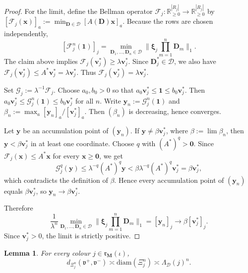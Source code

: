 \documentclass[12pt]{iopart}
\newtheorem{lemma}[theorem]{Lemma}
\newcommand*{\dist}{d}
\newcommand*{\bbbxi}{\boldsymbol{\xi}}
\newcommand*{\diam}{\mathrm{diam}}
\begin{document}
\begin{proof}
For the limit, define the Bellman operator
$\mathcal F_j:\mathbb R_{\ge 0}^{|R_j|}\to\mathbb R_{\ge 0}^{|R_j|}$ by
$[\mathcal F_j(\mathbf x)]_a:=\min_{\mathbf D\in\mathcal D}[A(\mathbf D)\mathbf x]_a$.
Because the rows are chosen independently,
\[
[\mathcal F_j^n(\mathbf 1)]_j
=
\min_{\mathbf D_1,\ldots,\mathbf D_n\in\mathcal D}
\bigg\|
\bbbxi_j\prod_{m=1}^n \mathbf D_m
\bigg\|_1.
\]
The claim above implies $\mathcal F_j(\mathbf v_j^*)\ge \lambda\mathbf v_j^*$.
Since $\mathbf D_j^*\in\mathcal D$, we also have
$\mathcal F_j(\mathbf v_j^*)\le A^*\mathbf v_j^*=\lambda\mathbf v_j^*$.
Thus $\mathcal F_j(\mathbf v_j^*)=\lambda\mathbf v_j^*$.

Set $\mathcal G_j:=\lambda^{-1}\mathcal F_j$.
Choose $a_0,b_0>0$ so that $a_0\mathbf v_j^*\le \mathbf 1\le b_0\mathbf v_j^*$.
Then $a_0\mathbf v_j^*\le \mathcal G_j^n(\mathbf 1)\le b_0\mathbf v_j^*$ for all $n$.
Write $\mathbf y_n:=\mathcal G_j^n(\mathbf 1)$ and
$\beta_n:=\max_a[\mathbf y_n]_a/[\mathbf v_j^*]_a$.
Then $(\beta_n)$ is decreasing, hence converges.

Let $\mathbf y$ be an accumulation point of $(\mathbf y_n)$.
If $\mathbf y\ne \beta\mathbf v_j^*$, where $\beta:=\lim\beta_n$, then
$\mathbf y<\beta\mathbf v_j^*$ in at least one coordinate.
Choose $q$ with $(A^*)^q>\mathbf 0$.
Since $\mathcal F_j(\mathbf x)\le A^*\mathbf x$ for every $\mathbf x\ge \mathbf 0$, we get
\[
\mathcal G_j^q(\mathbf y)
\le
\lambda^{-q}(A^*)^q\mathbf y
<
\beta\lambda^{-q}(A^*)^q\mathbf v_j^*
=
\beta\mathbf v_j^*,
\]
which contradicts the definition of $\beta$.
Hence every accumulation point of $(\mathbf y_n)$ equals $\beta\mathbf v_j^*$, so
$\mathbf y_n\to \beta\mathbf v_j^*$.

Therefore
\[
\frac{1}{\lambda^n}
\min_{\mathbf D_1,\ldots,\mathbf D_n\in\mathcal D}
\bigg\|
\bbbxi_j\prod_{m=1}^n \mathbf D_m
\bigg\|_1
=
[\mathbf y_n]_j
\to
\beta[\mathbf v_j^*]_j.
\]
Since $\mathbf v_j^*>0$, the limit is strictly positive.
\end{proof}

\begin{lemma}\label{lemma:diameter}
For every colour $j\in\mathfrak r_{\mathbf M}(\iota)$,
\[
{ \dist_{\Xi_j^n}(\mathfrak v^+,\mathfrak v^-)}
\asymp
\diam(\Xi_j^n)
\asymp
\Lambda_{\mathcal D}(j)^n.
\]
\end{lemma}
\end{document}
